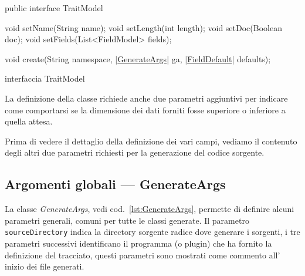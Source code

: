 \documentclass[a4paper,10pt]{report}
\newif\ifesource
\newenvironment{elisting}[1][!htb]
  {\captionsetup{aboveskip=0pt}\begin{listing}[#1]}
  {\end{listing}%
}
\begin{document}
\ifesource
\begin{figure*}[!htb]
\begin{lstlisting}[language=java, caption=interfaccia TraitModel, 
label=lst:TraitModel]
public interface TraitModel {
    void setName(String name);
    void setLength(int length);
    void setDoc(Boolean doc);
    void setFields(List<FieldModel> fields);

    void create(String namespace, (*\hyperref[lst:GenerateArgs]{GenerateArgs}*) ga, (*\hyperref[lst:FieldDefault]{FieldDefault}*) defaults);
}
\end{lstlisting}\index{TraitModel}
\end{figure*}
\else
\begin{elisting}
\begin{javacode}
public interface TraitModel {
    void setName(String name);
    void setLength(int length);
    void setDoc(Boolean doc);
    void setFields(List<FieldModel> fields);

    void create(String namespace, |\hyperref[lst:GenerateArgs]{GenerateArgs}| ga, |\hyperref[lst:FieldDefault]{FieldDefault}| defaults);
}
\end{javacode}
\caption{interfaccia TraitModel}
\label{lst:TraitModel}
\end{elisting}
\fi
La definizione della classe richiede anche due parametri aggiuntivi per indicare
come comportarsi se la dimensione dei dati forniti fosse superiore o inferiore a
quella attesa.

Prima di vedere il dettaglio della definizione dei vari campi, vediamo il 
contenuto degli altri due parametri richiesti per la generazione del codice
sorgente.

\subsection{Argomenti globali --- GenerateArgs}
La classe \textsl{GenerateArgs}, vedi cod.~\ref{lst:GenerateArgs}, permette di
definire alcuni parametri generali, comuni per tutte le classi generate.
Il parametro \texttt{sourceDirectory} indica la directory sorgente radice dove 
generare i sorgenti, i tre parametri successivi identificano il programma 
(o plugin) che ha fornito la definizione del tracciato, questi parametri sono 
mostrati come commento all'\,inizio dei file generati.
\end{document}
